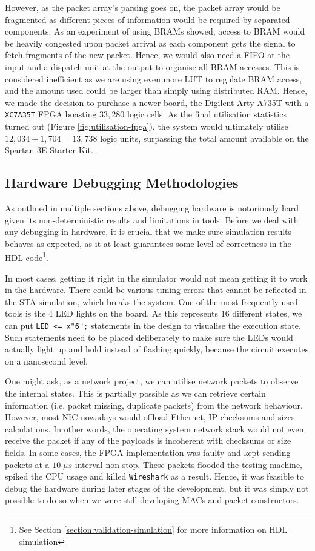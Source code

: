 \documentclass[a4paper]{report}
\newcommand{\code}{\texttt}
\begin{document}
However, as the packet array's parsing goes on, the packet array would be fragmented as different pieces of information would be required by separated components. As an experiment of using BRAMs showed, access to BRAM would be heavily congested upon packet arrival as each component gets the signal to fetch fragments of the new packet. Hence, we would also need a FIFO at the input and a dispatch unit at the output to organise all BRAM accesses. This is considered inefficient as we are using even more LUT to regulate BRAM access, and the amount used could be larger than simply using distributed RAM. Hence, we made the decision to purchase a newer board, the Digilent Arty-A735T with a \code{XC7A35T} FPGA boasting $33,280$ logic cells\cite{xilinx-documentation-artix}. As the final utilisation statistics turned out (Figure \ref{fig:utilisation-fpga}), the system would ultimately utilise $12,034 + 1,704 = 13,738$ logic units, surpassing the total amount available on the Spartan 3E Starter Kit.

\subsection{Hardware Debugging Methodologies}

As outlined in multiple sections above, debugging hardware is notoriously hard given its non-deterministic results and limitations in tools. Before we deal with any debugging in hardware, it is crucial that we make sure simulation results behaves as expected, as it at least guarantees some level of correctness in the HDL code\footnote{See Section \ref{section:validation-simulation} for more information on HDL simulation}. 

In most cases, getting it right in the simulator would not mean getting it to work in the hardware. There could be various timing errors that cannot be reflected in the STA simulation, which breaks the system. One of the most frequently used tools is the 4 LED lights on the board. As this represents 16 different states, we can put \code{LED <\null= x"6";} statements in the design to visualise the execution state. Such statements need to be placed deliberately to make sure the LEDs would actually light up and hold instead of flashing quickly, because the circuit executes on a nanosecond level.

One might ask, as a network project, we can utilise network packets to observe the internal states. This is partially possible as we can retrieve certain information (i.e. packet missing, duplicate packets) from the network behaviour. However, most NIC nowadays would offload Ethernet, IP checksums and sizes calculations. In other words, the operating system network stack would not even receive the packet if any of the payloads is incoherent with checksums or size fields. In some cases, the FPGA implementation was faulty and kept sending packets at a $10\; \mu s$ interval non-stop. These packets flooded the testing machine, spiked the CPU usage and killed \code{Wireshark} as a result. Hence, it was feasible to debug the hardware during later stages of the development, but it was simply not possible to do so when we were still developing MACs and packet constructors.
\end{document}
